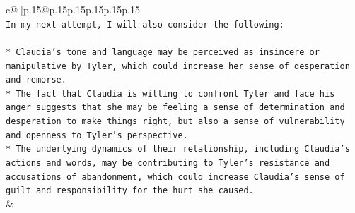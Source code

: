 \documentclass{article}
\begin{document}
{\begin{supertabular}{c@{$\;$}|p{.15\linewidth}@{}p{.15\linewidth}p{.15\linewidth}p{.15\linewidth}p{.15\linewidth}p{.15\linewidth}}
{{{\\ 
\texttt{In my next attempt, I will also consider the following:} \\
\\ 
\texttt{* Claudia's tone and language may be perceived as insincere or manipulative by Tyler, which could increase her sense of desperation and remorse.} \\
\texttt{* The fact that Claudia is willing to confront Tyler and face his anger suggests that she may be feeling a sense of determination and desperation to make things right, but also a sense of vulnerability and openness to Tyler's perspective.} \\
\texttt{* The underlying dynamics of their relationship, including Claudia's actions and words, may be contributing to Tyler's resistance and accusations of abandonment, which could increase Claudia's sense of guilt and responsibility for the hurt she caused.} \\
            }
        }
    }
    & \\ \\

\end{supertabular}
}
\end{document}
